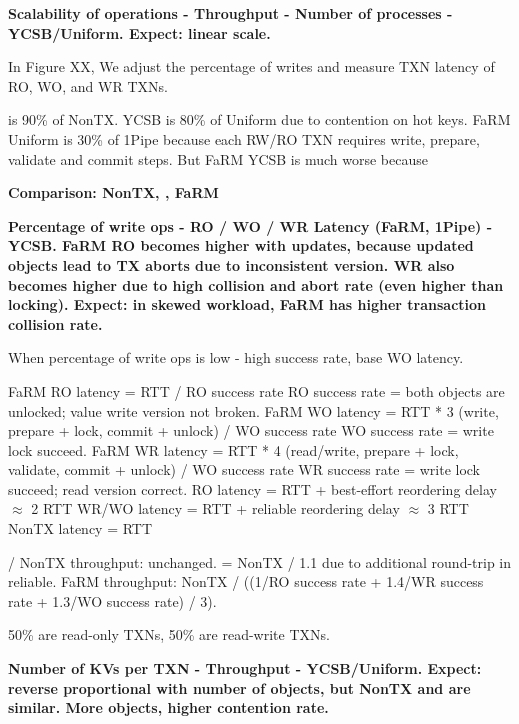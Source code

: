 \textbf{Scalability of operations - Throughput - Number of processes - YCSB/Uniform. Expect: linear scale.}

In Figure XX, We adjust the percentage of writes and measure TXN latency of RO, WO, and WR TXNs.

\sys{} is 90\% of NonTX. YCSB is 80\% of Uniform due to contention on hot keys. FaRM Uniform is 30\% of 1Pipe because each RW/RO TXN requires write, prepare, validate and commit steps. But FaRM YCSB is much worse because

\textbf{Comparison: NonTX, \sys{}, FaRM}

\textbf{Percentage of write ops - RO / WO / WR Latency (FaRM, 1Pipe) - YCSB. FaRM RO becomes higher with updates, because updated objects lead to TX aborts due to inconsistent version. WR also becomes higher due to high collision and abort rate (even higher than locking). Expect: in skewed workload, FaRM has higher transaction collision rate.}

When percentage of write ops is low - high success rate, base WO latency.



FaRM RO latency = RTT / RO success rate
RO success rate = both objects are unlocked; value write version not broken.
FaRM WO latency = RTT * 3 (write, prepare + lock, commit + unlock) / WO success rate
WO success rate = write lock succeed.
FaRM WR latency = RTT * 4 (read/write, prepare + lock, validate, commit + unlock) / WO success rate
WR success rate = write lock succeed; read version correct.
\sys{} RO latency = RTT + best-effort reordering delay $\approx$ 2 RTT
\sys{} WR/WO latency = RTT + reliable reordering delay $\approx$ 3 RTT
NonTX latency = RTT

\sys{} / NonTX throughput: unchanged.
\sys{}  = NonTX / 1.1 due to additional round-trip in reliable.
FaRM throughput: NonTX / ((1/RO success rate + 1.4/WR success rate + 1.3/WO success rate) / 3).

50\% are read-only TXNs, 50\% are read-write TXNs.

\textbf{Number of KVs per TXN - Throughput - YCSB/Uniform. Expect: reverse proportional with number of objects, but NonTX and \sys{} are similar. More objects, higher contention rate.}



